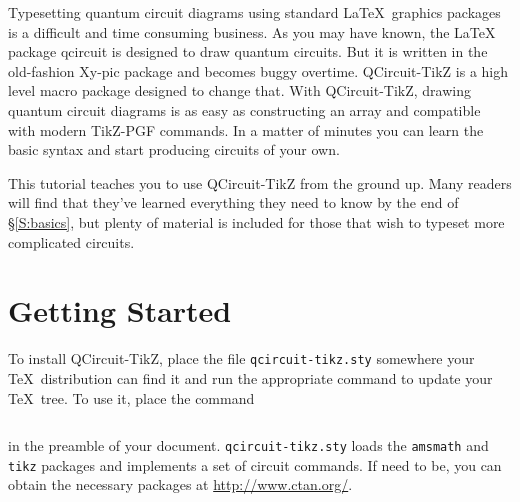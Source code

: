 \documentclass[twocolumn,nofootinbib,aps,,pra]{revtex4-1}
\newcommand{\ket}[1]{\ensuremath{\left|#1\right\rangle}}
\begin{document}
%
Typesetting quantum circuit diagrams using standard \LaTeX\ graphics packages is a difficult and time consuming business. 
As you may have known, the LaTeX package qcircuit is designed to draw quantum circuits.
But it is written in the old-fashion Xy-pic package and becomes buggy overtime.
QCircuit-TikZ is a high level macro package designed to change that. 
With QCircuit-TikZ, drawing quantum circuit diagrams is as easy as constructing an array and compatible with modern TikZ-PGF commands. 
In a matter of minutes you can learn the basic syntax and start producing circuits of your own.

This tutorial teaches you to use QCircuit-TikZ from the ground up. 
Many readers will find that they've learned everything they need to know by the end of \S\ref{S:basics}, but plenty of material is included for those that wish to typeset more complicated circuits.

\section{Getting Started}

To install QCircuit-TikZ, place the file \verb=qcircuit-tikz.sty= somewhere your \TeX\ distribution can find it and run the appropriate command to update your \TeX\ tree. 
To use it, place the command
{\small \begin{verbatim}\end{verbatim}}  
\noindent in the preamble of your document. 
\verb=qcircuit-tikz.sty= loads the \verb=amsmath= and \verb=tikz= packages and implements a set of circuit commands. 
If need to be, you can obtain the necessary packages at \href{http://www.ctan.org/}{http://www.ctan.org/}.
\end{document}
